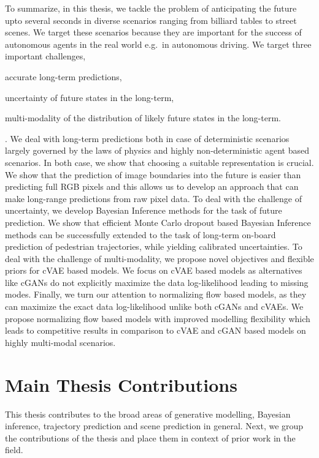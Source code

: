 To summarize, in this thesis, we tackle the problem of anticipating the future upto several seconds in diverse scenarios ranging from billiard tables to street scenes. We target these scenarios because they are important for the success of autonomous agents in the real world e.g.\ in autonomous driving. We target three important challenges, \begin{enumerate*}
\item accurate long-term predictions,
\item uncertainty of future states in the long-term,
\item multi-modality of the distribution of likely future states in the long-term.
\end{enumerate*}. 
We deal with long-term predictions both in case of deterministic scenarios largely governed by the laws of physics and highly non-deterministic agent based scenarios. In both case, we show that choosing a suitable representation is crucial. We show that the prediction of image boundaries into the future is easier than predicting full RGB pixels and this allows us to develop an approach that can make long-range predictions from raw pixel data. To deal with the challenge of uncertainty, we develop Bayesian Inference methods for the task of future prediction. We show that efficient Monte Carlo dropout based Bayesian Inference methods can be successfully extended to the task of long-term on-board prediction of pedestrian trajectories, while yielding calibrated uncertainties. To deal with the challenge of multi-modality, we propose novel objectives and flexible priors for cVAE based models. We focus on cVAE based models as alternatives like cGANs do not explicitly maximize the data log-likelihood leading to missing modes. Finally, we turn our attention to normalizing flow based models, as they can maximize the exact data log-likelihood unlike both cGANs and cVAEs. We propose normalizing flow based models with improved modelling flexibility which leads to competitive results in comparison to cVAE and cGAN based models on highly multi-modal scenarios.   


\section{Main Thesis Contributions}
This thesis contributes to the broad areas of generative modelling, Bayesian inference, trajectory prediction and scene prediction in general. Next, we group the contributions of the thesis and place them in context of prior work in the field. 

